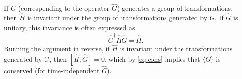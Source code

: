     If $G$ (corresponding to the operator $\hat{G}$) generates a group of transformations, then $\hat{H}$ is invariant under the group of transformations generated by $G$. If $\hat{G}$ is unitary, this invariance is often expressed as 
    \begin{align*}
        \hat{G}^\dagger\hat{H}\hat{G} = \hat{H}.
    \end{align*}
    Running the argument in reverse, if $\hat{H}$ is invariant under the transformations generated by $G$, then $[\hat{H},\hat{G}]=0$, which by \cref{eq:cons} implies that $\braket{G}$ is conserved (for time-independent $\hat{G}$).

